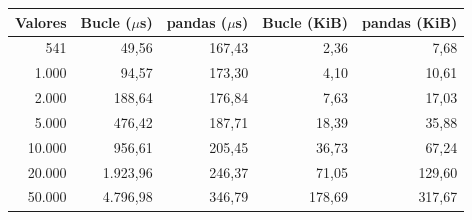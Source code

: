 \begin{tabular}{rrrrr}
\toprule
Valores & Bucle ($\mu$s) & pandas ($\mu$s) & Bucle (KiB) & pandas (KiB) \\
\midrule
541 & 49,56 & 167,43 & 2,36 & 7,68 \\
1.000 & 94,57 & 173,30 & 4,10 & 10,61 \\
2.000 & 188,64 & 176,84 & 7,63 & 17,03 \\
5.000 & 476,42 & 187,71 & 18,39 & 35,88 \\
10.000 & 956,61 & 205,45 & 36,73 & 67,24 \\
20.000 & 1.923,96 & 246,37 & 71,05 & 129,60 \\
50.000 & 4.796,98 & 346,79 & 178,69 & 317,67 \\
\bottomrule
\end{tabular}
